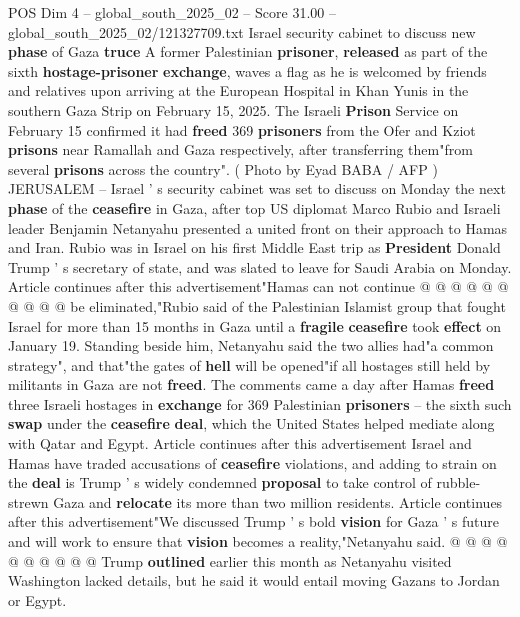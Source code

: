 \begin{textsample}{POS Dim 4 – global\_south\_2025\_02 – Score 31.00 – global\_south\_2025\_02/121327709.txt}  \label{ex:f4_pos_026}
Israel security cabinet to discuss new \textbf{phase} of Gaza \textbf{truce} A former Palestinian \textbf{prisoner}, \textbf{released} as part of the sixth \textbf{hostage-prisoner} \textbf{exchange}, waves a flag as he is welcomed by friends and relatives upon arriving at the European Hospital in Khan Yunis in the southern Gaza Strip on February 15, 2025.
The Israeli \textbf{Prison} Service on February 15 confirmed it had \textbf{freed} 369 \textbf{prisoners} from the Ofer and Kziot \textbf{prisons} near Ramallah and Gaza respectively, after transferring them"from several \textbf{prisons} across the country". ( Photo by Eyad BABA / AFP ) JERUSALEM -- Israel ' s security cabinet was set to discuss on Monday the next \textbf{phase} of the \textbf{ceasefire} in Gaza, after top US diplomat Marco Rubio and Israeli leader Benjamin Netanyahu presented a united front on their approach to Hamas and Iran.
Rubio was in Israel on his first Middle East trip as \textbf{President} Donald Trump ' s secretary of state, and was slated to leave for Saudi Arabia on Monday.
Article continues after this advertisement"Hamas can not continue @ @ @ @ @ @ @ @ @ @ be eliminated,"Rubio said of the Palestinian Islamist group that fought Israel for more than 15 months in Gaza until a \textbf{fragile} \textbf{ceasefire} took \textbf{effect} on January 19.
Standing beside him, Netanyahu said the two allies had"a common strategy", and that"the gates of \textbf{hell} will be opened"if all hostages still held by militants in Gaza are not \textbf{freed}.
The comments came a day after Hamas \textbf{freed} three Israeli hostages in \textbf{exchange} for 369 Palestinian \textbf{prisoners} -- the sixth such \textbf{swap} under the \textbf{ceasefire} \textbf{deal}, which the United States helped mediate along with Qatar and Egypt.
Article continues after this advertisement Israel and Hamas have traded accusations of \textbf{ceasefire} violations, and adding to strain on the \textbf{deal} is Trump ' s widely condemned \textbf{proposal} to take control of rubble-strewn Gaza and \textbf{relocate} its more than two million residents.
Article continues after this advertisement"We discussed Trump ' s bold \textbf{vision} for Gaza ' s future and will work to ensure that \textbf{vision} becomes a reality,"Netanyahu said. @ @ @ @ @ @ @ @ @ @ Trump \textbf{outlined} earlier this month as Netanyahu visited Washington lacked details, but he said it would entail moving Gazans to Jordan or Egypt.

\end{textsample}
